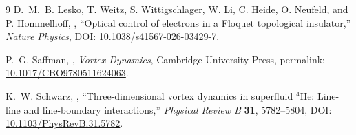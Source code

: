 \begin{thebibliography}{9}
D.~M.~B. Lesko, T. Weitz, S. Wittigschlager, W. Li, C. Heide, O. Neufeld, and P. Hommelhoff,
, ``Optical control of electrons in a Floquet topological insulator,''
\newblock \emph{Nature Physics}, DOI: \href{https://doi.org/10.1038/s41567-026-03429-7}{10.1038/s41567-026-03429-7}.

P.~G. Saffman,
, \emph{Vortex Dynamics}, Cambridge University Press,
\newblock permalink: \href{https://doi.org/10.1017/CBO9780511624063}{10.1017/CBO9780511624063}.

K.~W. Schwarz,
, ``Three-dimensional vortex dynamics in superfluid $^4$He: Line-line and line-boundary interactions,''
\newblock \emph{Physical Review B} \textbf{31}, 5782--5804,
\newblock DOI: \href{https://doi.org/10.1103/PhysRevB.31.5782}{10.1103/PhysRevB.31.5782}.
\end{thebibliography}
